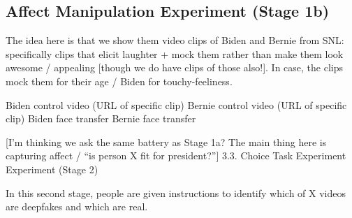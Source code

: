 
\subsection{Affect Manipulation Experiment (Stage 1b)}



The idea here is that we show them video clips of Biden and Bernie
from SNL: specifically clips that elicit laughter + mock them rather
than make them look awesome / appealing [though we do have clips of
  those also!]. In case, the clips mock them for their age / Biden for
touchy-feeliness.

Biden control video (URL of specific clip)
Bernie control video (URL of specific clip)
Biden face transfer
Bernie face transfer

[I’m thinking we ask the same battery as Stage 1a? The main thing here is capturing affect / “is person X fit for president?”] 
3.3. Choice Task Experiment Experiment (Stage 2)

In this second stage, people are given instructions to identify which
of X videos are deepfakes and which are real.

